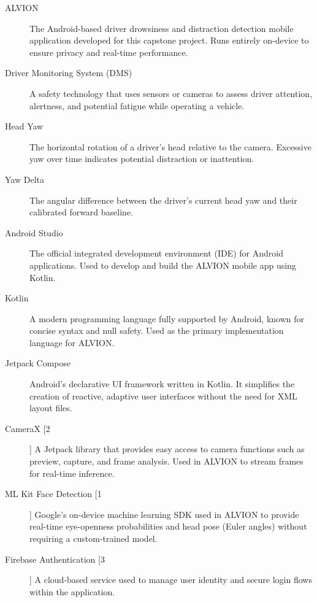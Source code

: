 \documentclass[11pt]{report}
\begin{document}
\begin{description}

    \item[ALVION] The Android-based driver drowsiness and distraction detection mobile application developed for this capstone project. Runs entirely on-device to ensure privacy and real-time performance.

    \item[Driver Monitoring System (DMS)] A safety technology that uses sensors or cameras to assess driver attention, alertness, and potential fatigue while operating a vehicle.

    \item[Head Yaw] The horizontal rotation of a driver’s head relative to the camera. Excessive yaw over time indicates potential distraction or inattention.

    \item[Yaw Delta] The angular difference between the driver's current head yaw and their calibrated forward baseline.

    \item[Android Studio] The official integrated development environment (IDE) for Android applications. Used to develop and build the ALVION mobile app using Kotlin.

    \item[Kotlin] A modern programming language fully supported by Android, known for concise syntax and null safety. Used as the primary implementation language for ALVION.

    \item[Jetpack Compose] Android’s declarative UI framework written in Kotlin. It simplifies the creation of reactive, adaptive user interfaces without the need for XML layout files.

    \item[CameraX [2]] A Jetpack library that provides easy access to camera functions such as preview, capture, and frame analysis. Used in ALVION to stream frames for real-time inference.

    \item[ML Kit Face Detection [1]] Google’s on-device machine learning SDK used in ALVION to provide real-time eye-openness probabilities and head pose (Euler angles) without requiring a custom-trained model.

    \item[Firebase Authentication [3]] A cloud-based service used to manage user identity and secure login flows within the application.


\end{description}
\end{document}
